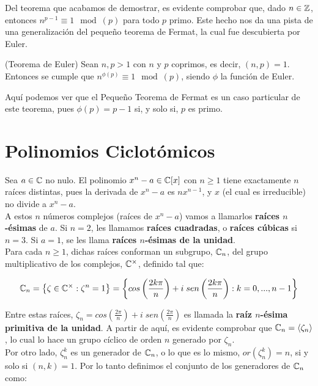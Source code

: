 Del teorema que acabamos de demostrar, es evidente comprobar que, dado $n \in \mathbb{Z}$, entonces $n^{p-1} \equiv 1 \mod(p)$ para todo $p$ primo. Este hecho nos da una pista de una generalización del pequeño teorema de Fermat, la cual fue descubierta por Euler.

\begin{teorema}{(Teorema de Euler)}
	Sean $n, p > 1$ con $n$ y $p$ coprimos, es decir, $(n, p) = 1$. Entonces se cumple que $n^{\phi(p)} \equiv 1 \mod(p)$, siendo $\phi$ la función de Euler.
\end{teorema}

Aquí podemos ver que el Pequeño Teorema de Fermat es un caso particular de este teorema, pues $\phi(p) = p-1$ si, y solo si, $p$ es primo.

\section{Polinomios Ciclotómicos}

Sea $a \in \mathbb{C}$ no nulo. El polinomio $x^n - a \in \mathbb{C}[x]$ con $n \geq 1$ tiene exactamente $n$ raíces distintas, pues la derivada de $x^n - a$ es $nx^{n-1}$, y $x$ (el cual es irreducible) no divide a $x^n - a$.\\

A estos $n$ números complejos (raíces de $x^n - a$) vamos a llamarlos \textbf{raíces $n$-ésimas} de $a$. Si $n=2$, les llamamos \textbf{raíces cuadradas}, o \textbf{raíces cúbicas} si $n=3$. Si $a=1$, se les llama \textbf{raíces $n$-ésimas de la unidad}.\\

Para cada $n \geq 1$, dichas raíces conforman un subgrupo, $\mathbb{C}_n$, del grupo multiplicativo de los complejos, $\mathbb{C}^\times$, definido tal que:

\[ \mathbb{C}_n = \left\lbrace \zeta \in \mathbb{C}^\times : \zeta^n = 1 \right\rbrace = \left\lbrace cos\left(\frac{2k\pi}{n}\right) + i\;sen\left(\frac{2k\pi}{n}\right): k=0,...,n-1  \right\rbrace \]

Entre estas raíces, $\zeta_n = cos\left(\frac{2\pi}{n}\right) + i\;sen\left(\frac{2\pi}{n}\right)$ es llamada la \textbf{raíz $n$-ésima primitiva de la unidad}. A partir de aquí, es evidente comprobar que $\mathbb{C}_n = \left\langle \zeta_n \right\rangle$, lo cual lo hace un grupo cíclico de orden $n$ generado por $\zeta_n$.\\

Por otro lado, $\zeta_n^k$ es un generador de $\mathbb{C}_n$, o lo que es lo mismo, $or(\zeta_n^k) = n$, si y solo si $(n, k) = 1$. Por lo tanto definimos el conjunto de los generadores de $\mathbb{C}_n$ como:

